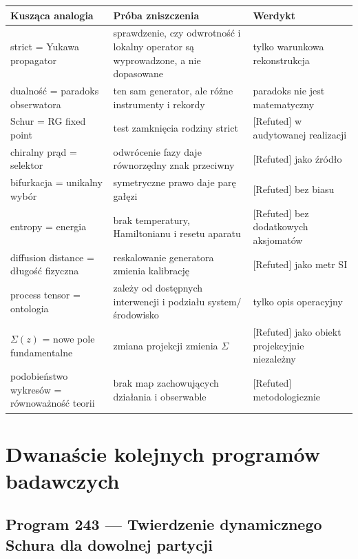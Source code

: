 \documentclass[11pt,a4paper,openany]{report}
\newcommand{\statusRefuted}{\textcolor{finred}{[Refuted]}}
\begin{document}
\begin{center}
\begingroup\small
\setlength{\tabcolsep}{3.5pt}
\renewcommand{\arraystretch}{1.16}
\begin{longtable}{@{}p{}p{}p{}@{}}
\toprule
\textbf{Kusząca analogia} & \textbf{Próba zniszczenia} & \textbf{Werdykt} \\
\midrule
\endhead
strict = Yukawa propagator & sprawdzenie, czy odwrotność i lokalny operator są wyprowadzone, a nie dopasowane & tylko warunkowa rekonstrukcja \\
dualność = paradoks obserwatora & ten sam generator, ale ró\.zne instrumenty i rekordy & paradoks nie jest matematyczny \\
Schur = RG fixed point & test zamknięcia rodziny strict & \statusRefuted{} w audytowanej realizacji \\
chiralny prąd = selektor & odwrócenie fazy daje równorzędny znak przeciwny & \statusRefuted{} jako źródło \\
bifurkacja = unikalny wybór & symetryczne prawo daje parę gałęzi & \statusRefuted{} bez biasu \\
entropy = energia & brak temperatury, Hamiltonianu i resetu aparatu & \statusRefuted{} bez dodatkowych aksjomatów \\
diffusion distance = długość fizyczna & reskalowanie generatora zmienia kalibrację & \statusRefuted{} jako metr SI \\
process tensor = ontologia & zale\.zy od dostępnych interwencji i podziału system/\allowbreak{}środowisko & tylko opis operacyjny \\
\(\Sigma(z)\) = nowe pole fundamentalne & zmiana projekcji zmienia \(\Sigma\) & \statusRefuted{} jako obiekt projekcyjnie niezale\.zny \\
podobieństwo wykresów = równowa\.zność teorii & brak map zachowujących działania i obserwable & \statusRefuted{} metodologicznie \\
\bottomrule
\end{longtable}
\endgroup
\end{center}

\chapter{Dwanaście kolejnych programów badawczych}

\section{Program 243 --- Twierdzenie dynamicznego Schura dla dowolnej partycji}
\end{document}
